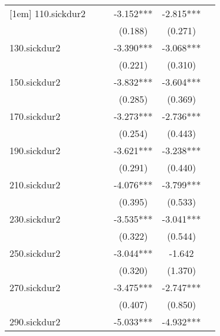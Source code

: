 \begin{table}[htbp]
\begin{tabular}{l*{5}{c}}
[1em]
110.sickdur2&               &               &      -3.152***&      -2.815***&               \\
            &               &               &     (0.188)   &     (0.271)   &               \\
[1em]
130.sickdur2&               &               &      -3.390***&      -3.068***&               \\
            &               &               &     (0.221)   &     (0.310)   &               \\
[1em]
150.sickdur2&               &               &      -3.832***&      -3.604***&               \\
            &               &               &     (0.285)   &     (0.369)   &               \\
[1em]
170.sickdur2&               &               &      -3.273***&      -2.736***&               \\
            &               &               &     (0.254)   &     (0.443)   &               \\
[1em]
190.sickdur2&               &               &      -3.621***&      -3.238***&               \\
            &               &               &     (0.291)   &     (0.440)   &               \\
[1em]
210.sickdur2&               &               &      -4.076***&      -3.799***&               \\
            &               &               &     (0.395)   &     (0.533)   &               \\
[1em]
230.sickdur2&               &               &      -3.535***&      -3.041***&               \\
            &               &               &     (0.322)   &     (0.544)   &               \\
[1em]
250.sickdur2&               &               &      -3.044***&      -1.642   &               \\
            &               &               &     (0.320)   &     (1.370)   &               \\
[1em]
270.sickdur2&               &               &      -3.475***&      -2.747***&               \\
            &               &               &     (0.407)   &     (0.850)   &               \\
[1em]
290.sickdur2&               &               &      -5.033***&      -4.932***&               \\

\end{tabular}
\end{table}
